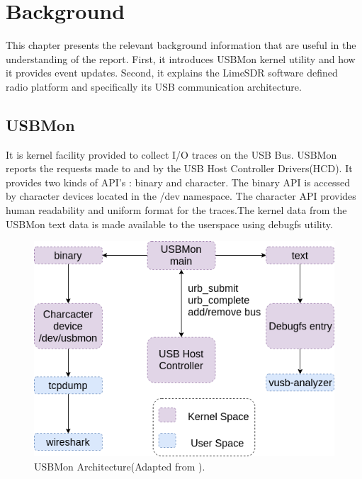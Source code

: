 \documentclass{kththesis}
\begin{document}
\chapter{Background}
This chapter presents the relevant background information that are useful in the understanding of the report. First, it introduces USBMon kernel utility and how it provides event updates. Second, it explains the LimeSDR software defined radio platform and specifically its USB communication architecture.

\section{USBMon}
It is kernel facility provided to collect I/O traces on the USB Bus\cite{_usbmon}. USBMon reports the requests made to and by the USB Host Controller Drivers(HCD). It provides two kinds of API's : binary and character. The binary API is accessed by character devices located in the /dev namespace. The character API provides human readability and uniform format for the traces.The kernel data from the USBMon text data is made available to the userspace using debugfs\cite{_debugfs} utility.

\begin{figure}[h!]
\centering
\includegraphics[width=\textwidth]{USBMon.png}
\caption{USBMon Architecture(Adapted from \cite{basak_usb_2018}).}
\end{figure}
\end{document}

